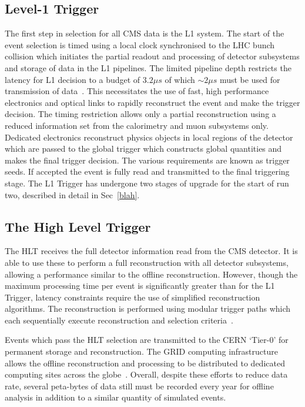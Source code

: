 \subsection{Level-1 Trigger}

The first step in selection for all CMS data is the L1 system. The start of the event selection is timed using a local clock
synchronised to the LHC bunch collision which initiates the partial readout and processing of detector subsystems and storage 
of data in the L1 pipelines. The limited pipeline depth restricts the latency for L1 decision to a budget of $3.2\mu s$
of which $\sim2\mu s$ must be used for transmission of data~\cite{daq_performance}. This necessitates the use of fast, high performance electronics
and optical links to rapidly reconstruct the event and make the trigger decision. The timing restriction allows only 
a partial reconstruction using a reduced information set from the calorimetry and muon subsystems only. Dedicated electronics
reconstruct physics objects in local regions of the detector which are passed to the global trigger which constructs global
quantities and makes the final trigger decision. The various requirements are known as trigger seeds. 
If accepted the event is fully read and transmitted to the final triggering
stage. The L1 Trigger has undergone two stages of upgrade for the start of run two, described in detail in Sec~\ref{blah}.

\subsection{The High Level Trigger}

The HLT receives the full detector information read from the CMS detector. It is able to use these to perform 
a full reconstruction with all detector subsystems, allowing a performance similar to the offline reconstruction. However, 
though the maximum processing time per event is significantly greater than for the L1 Trigger, latency constraints 
require the use of simplified reconstruction algorithms. The reconstruction is performed using modular trigger paths
which each sequentially execute reconstruction and selection criteria~\cite{daq_performance}. 

Events which pass the HLT selection are transmitted to the CERN `Tier-0' for permanent storage and reconstruction. 
The GRID computing infrastructure allows the offline reconstruction and processing to be distributed to dedicated 
computing sites across the globe~\cite{grid_tdr}. Overall, despite these efforts to reduce data rate, 
several peta-bytes of data still must be recorded every year for offline analysis in addition to 
a similar quantity of simulated events.

